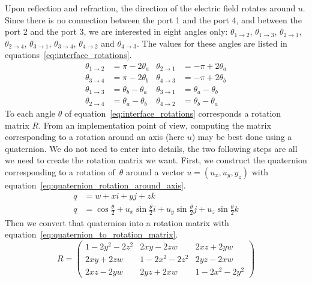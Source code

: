 Upon reflection and refraction, the direction of the electric field rotates around $u$.
Since there is no connection between the port 1 and the port 4, and between the port 2 and the port 3, we are interested in eight angles only: $\theta_{1 \rightarrow 2}$, $\theta_{1 \rightarrow 3}$, $\theta_{2 \rightarrow 1}$, $\theta_{2 \rightarrow 4}$, $\theta_{3 \rightarrow 1}$, $\theta_{3 \rightarrow 4}$, $\theta_{4 \rightarrow 2}$ and $\theta_{4 \rightarrow 3}$.
The values for these angles are listed in equations~\eqref{eq:interface_rotations}.
\begin{equation}
    \begin{aligned}
        \theta_{1 \rightarrow 2} &= \pi - 2\theta_a
        &
        \theta_{2 \rightarrow 1} &= -\pi + 2\theta_a
        \\
        \theta_{3 \rightarrow 4} &= \pi - 2\theta_b
        &
        \theta_{4 \rightarrow 3} &= -\pi + 2\theta_b
        \\
        \theta_{1 \rightarrow 3} &= \theta_b - \theta_a
        &
        \theta_{3 \rightarrow 1} &= \theta_a - \theta_b
        \\
        \theta_{2 \rightarrow 4} &= \theta_a - \theta_b
        &
        \theta_{4 \rightarrow 2} &= \theta_b - \theta_a
    \end{aligned}
    \label{eq:interface_rotations}
\end{equation}
To each angle $\theta$ of equation~\eqref{eq:interface_rotations} corresponds a rotation matrix $R$.
From an implementation point of view, computing the matrix corresponding to a rotation around an axis (here $u$) may be best done using a quaternion.
We do not need to enter into details, the two following steps are all we need to create the rotation matrix we want.
First, we construct the quaternion corresponding to a rotation of~$\theta$ around a vector $u=(u_x, u_y, y_z)$ with equation~\eqref{eq:quaternion_rotation_around_axis}.
\begin{equation}
    \begin{aligned}
        q &= w + xi + yj + zk
        \\
        q &= \cos \frac{\theta}{2}
           + u_x \sin \frac{\theta}{2} i
           + u_y \sin \frac{\theta}{2} j
           + u_z \sin \frac{\theta}{2} k
    \end{aligned}
    \label{eq:quaternion_rotation_around_axis}
\end{equation}
Then we convert that quaternion into a rotation matrix with equation~\eqref{eq:quaternion_to_rotation_matrix}.
\begin{equation}
    R =
    \begin{pmatrix}
        1 - 2y^2 - 2z^2   &   2xy - 2zw         &   2xz + 2yw \\
        2xy + 2zw         &   1 - 2x^2 - 2z^2   &   2yz - 2xw \\
        2xz - 2yw         &   2yz + 2xw         &   1 - 2x^2 - 2y^2
    \end{pmatrix}
    \label{eq:quaternion_to_rotation_matrix}
\end{equation}



